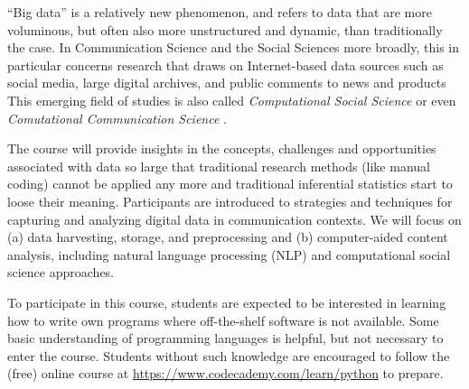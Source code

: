 
``Big data'' is a relatively new phenomenon, and refers to data that are more voluminous, but often also more unstructured and dynamic, than traditionally the case. In Communication Science and the Social Sciences more broadly, this in particular concerns research that draws on Internet-based data sources such as social media, large digital archives, and public comments to news and products This emerging field of studies is also called \emph{Computational Social Science} \citep{Lazer2009} or even \emph{Comutational Communication Science} \citep{Shah2015}.


The course will provide insights in the concepts, challenges and opportunities associated with data so large that traditional research methods (like manual coding) cannot be applied any more and traditional inferential statistics start to loose their meaning. Participants are introduced to strategies and techniques for capturing and analyzing digital data in communication contexts. We will focus on (a) data harvesting, storage, and preprocessing and (b) computer-aided content analysis, including natural language processing (NLP) and computational social science approaches.

To participate in this course, students are expected to be interested in learning how to write own programs where off-the-shelf software is not available. Some basic understanding of programming languages is helpful, but not necessary to enter the course. Students without such knowledge are encouraged to follow the (free) online course at \url{https://www.codecademy.com/learn/python} to prepare.